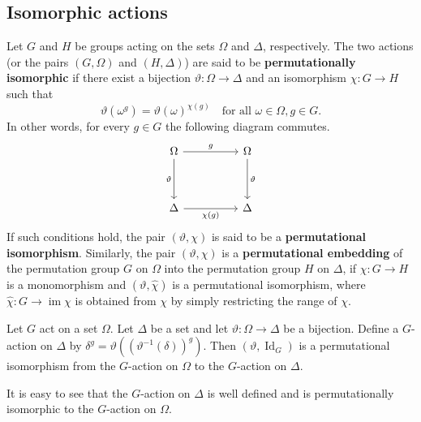 \subsection{Isomorphic actions}
\begin{definition}
	Let $G$ and $H$ be groups acting on the sets $\Omega$ and $\Delta$, respectively. The two actions (or the pairs $(G,\Omega)$ and $(H,\Delta)$) are said to be \textbf{permutationally isomorphic} if there exist a bijection $\vartheta: \Omega \to \Delta$ and an isomorphism $\chi: G \to H$ such that
	\[ \vartheta(\omega^g) = \vartheta(\omega)^{\chi(g)} \quad \text{for all } \omega \in \Omega, g \in G. \] In other words, for every $g\in G$ the following diagram commutes.
	\[\begin{tikzcd}
		\Omega && \Omega \\
		\\
		\Delta && \Delta
		\arrow["g", from=1-1, to=1-3]
		\arrow["\vartheta"', from=1-1, to=3-1]
		\arrow["\vartheta", from=1-3, to=3-3]
		\arrow["{\chi(g)}"', from=3-1, to=3-3]
	\end{tikzcd}\]
	If such conditions hold, the pair $(\vartheta, \chi)$ is said to be a \textbf{permutational isomorphism}. Similarly, the pair $(\vartheta, \chi)$ is a \textbf{permutational embedding} of the permutation group $G$ on $\Omega$ into the permutation group $H$ on $\Delta$, if $\chi: G \to H$ is a monomorphism and $(\vartheta, \hat{\chi})$ is a permutational isomorphism, where $\hat{\chi}: G \to \operatorname{im}\chi$ is obtained from $\chi$ by simply restricting the range of $\chi$.
\end{definition}


\begin{proposition}
	Let $G$ act on a set $\Omega$. Let $\Delta$ be a set and let $\vartheta: \Omega \to \Delta$ be a bijection. Define a $G$-action on $\Delta$ by $\delta^g = \vartheta((\vartheta^{-1}(\delta))^g)$. Then $(\vartheta, \operatorname{Id}_G)$ is a permutational isomorphism from the $G$-action on $\Omega$ to the $G$-action on $\Delta$.
\end{proposition}

\begin{sketch}
	It is easy to see that the $G$-action on $\Delta$ is well defined and is permutationally isomorphic to the $G$-action on $\Omega$. 
\end{sketch}


